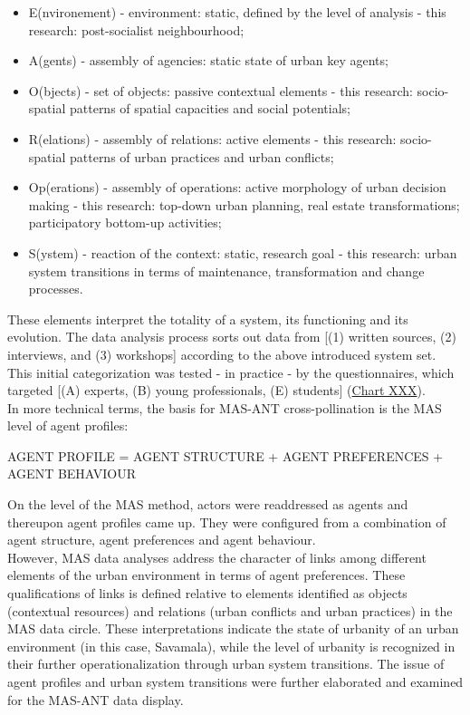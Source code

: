 \documentclass[11pt]{report}
\begin{document}
{{{{\begin{itemize}
\item E(nvironement) - environment: static, defined by the level of analysis - this research: post-socialist neighbourhood;
\item A(gents) - assembly of agencies: static state of urban key agents;
\item O(bjects) - set of objects: passive contextual elements - this research: socio-spatial patterns of spatial capacities and social potentials;
\item R(elations) - assembly of relations: active elements - this research: socio-spatial patterns of urban practices and urban conflicts;
\item Op(erations) - assembly of operations: active morphology of urban decision making - this research: top-down urban planning, real estate transformations; participatory bottom-up activities;
\item S(ystem) - reaction of the context: static, research goal - this research:  urban system transitions in terms of maintenance, transformation and change processes.
\end{itemize}

These elements interpret the totality of a system, its functioning and its evolution.
The data analysis process sorts out data from [(1) written sources, (2) interviews, and (3) workshops] according to the above introduced system set.
This initial categorization was tested - in practice - by the questionnaires, which targeted [(A) experts, (B) young professionals, (E) students] (\href{Table data sources}{Chart XXX}).
\\
In more technical terms, the basis for MAS-ANT cross-pollination is the MAS level of agent profiles:

AGENT PROFILE = AGENT STRUCTURE + AGENT PREFERENCES + AGENT BEHAVIOUR

On the level of the MAS method, actors were readdressed as agents and thereupon agent profiles came up. They were configured from a combination of agent structure, agent preferences and agent behaviour.
\\

However, MAS data analyses address the character of links among different elements of the urban environment in terms of agent preferences. These qualifications of links is defined relative to elements identified as objects (contextual resources) and relations (urban conflicts and urban practices) in the MAS data circle. These interpretations indicate the state of urbanity of an urban environment (in this case, Savamala), while the level of urbanity is recognized in their further operationalization through urban system transitions. The issue of agent profiles and urban system transitions were further elaborated and examined for the MAS-ANT data display.

}}}}
\end{document}
